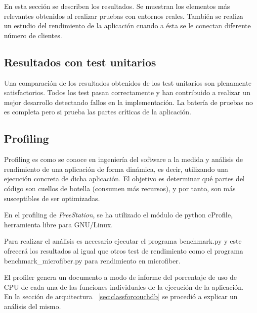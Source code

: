 En esta sección se describen los resultados. Se muestran los
elementos más relevantes obtenidos al realizar pruebas con entornos reales.
También se realiza un estudio del rendimiento de la aplicación cuando a ésta 
se le conectan diferente número de clientes.

\subsection{Resultados con test unitarios}

Una comparación de los resultados obtenidos de los test unitarios son plenamente
satisfactorios. Todos los test pasan correctamente y han contribuido a
realizar un mejor desarrollo detectando fallos en la implementación. La batería
de pruebas no es completa pero si prueba las partes críticas de la aplicación.

\subsection{Profiling}

Profiling es como se conoce en ingeniería del software a la medida y 
análisis de rendimiento de una aplicación de forma dinámica, es decir, 
utilizando una ejecución concreta de dicha aplicación. El objetivo es determinar
qué partes del código son cuellos de botella (consumen más recursos), y por 
tanto, son más susceptibles de ser optimizadas.

En el profiling de \emph{FreeStation}, se ha utilizado el módulo de
python cProfile, herramienta libre para GNU/Linux.

Para realizar el análisis es necesario ejecutar el programa benchmark.py y este
ofrecerá los resultados al igual que otros test de rendimiento como el programa
benchmark\_microfiber.py para rendimiento en microfiber.

El profiler genera un documento a modo de informe del porcentaje de uso de CPU 
de cada una de las funciones individuales de la ejecución de la aplicación.
En la sección de arquitectura ~\ref{sec:classforcouchdb} se procedió a explicar
un análisis del mismo.